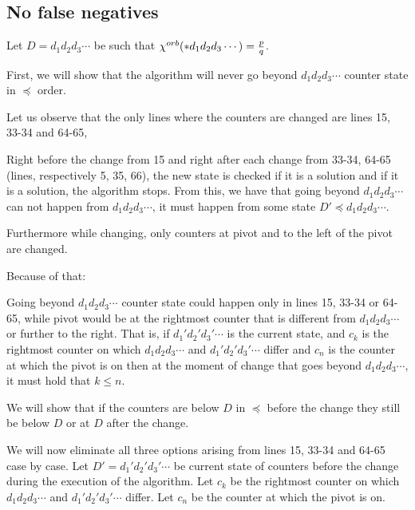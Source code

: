 \subsection{No false negatives}
Let $D = d_1d_2d_3\cdots$ be such that ${\chi^{orb}(*d_1d_2d_3\cdots)} = \frac{p}{q}$. 

%

First, we will show that the algorithm will never 
go beyond $d_1d_2d_3\cdots$ counter state in $\preceq$ order. 

Let us observe that the only lines where 
the counters are changed are lines 15, 33-34 and 64-65, 

Right before 
the change from 15 and right after each change from 33-34, 64-65 
(lines, respectively 5, 35, 66), 
the new state is checked if it is a solution and 
if it is a solution, the algorithm stops. From this, we 
have that going beyond $d_1d_2d_3\cdots$ can not happen from $d_1d_2d_3\cdots$, 
it must happen from some state $D' \preceq d_1d_2d_3\cdots$.

Furthermore while changing, 
only counters 
at pivot and to the left of the pivot are changed. 

Because of that:
\begin{observation}\label{position of pointer observation}
Going beyond $d_1d_2d_3\cdots$ counter state 
could happen only in lines 15, 33-34 or 64-65, while pivot would be 
at the rightmost counter that is different from $d_1d_2d_3\cdots$ or further to the right. 
That is, if $d_1'd_2'd_3'\cdots$ is the current state, and 
$c_k$ is the rightmost counter on which $d_1d_2d_3\cdots$ 
and $d_1'd_2'd_3'\cdots$ differ and $c_n$ is the counter at which the pivot is on then 
at the moment of change that goes beyond $d_1d_2d_3\cdots$, it must hold that $k \leq n$.
\end{observation}

We will show that if the counters are below $D$ in $\preceq$ before the change they still 
be below $D$ or at $D$ after the change. 

We will now eliminate all three options arising from lines 15, 33-34 and 64-65 case by case. 
Let $D' = d_1'd_2'd_3'\cdots$ be current state of counters before the change 
during the execution of the algorithm. 
Let $c_k$ be the rightmost counter on which $d_1d_2d_3\cdots$ 
and $d_1'd_2'd_3'\cdots$ differ. Let $c_n$ be the counter at which the pivot is on. 
